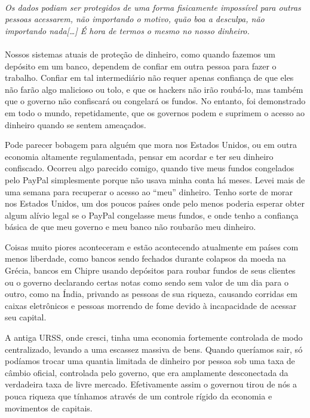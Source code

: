\paragraph{}
\textit{Os dados podiam ser protegidos de uma forma fisicamente impossível para outras pessoas acessarem, não importando o motivo, quão boa a desculpa, não importando nada[\ldots] É hora de termos o mesmo no nosso dinheiro.}
\paragraph{}

Nossos sistemas atuais de proteção de dinheiro, como quando fazemos um depósito em um banco, dependem de confiar em outra pessoa para fazer o trabalho. Confiar em tal intermediário não requer apenas confiança de que eles não farão algo malicioso ou tolo, e que os hackers não irão roubá-lo, mas também que o governo não confiscará ou congelará os fundos. No entanto, foi demonstrado em todo o mundo, repetidamente, que os governos podem e suprimem o acesso ao dinheiro quando se sentem ameaçados.

Pode parecer bobagem para alguém que mora nos Estados Unidos, ou em outra economia altamente regulamentada, pensar em acordar e ter seu dinheiro confiscado. Ocorreu algo parecido comigo, quando tive meus fundos congelados pelo PayPal simplesmente porque não usava minha conta há meses. Levei mais de uma semana para recuperar o acesso ao “meu” dinheiro. Tenho sorte de morar nos Estados Unidos, um dos poucos países onde pelo menos poderia esperar obter algum alívio legal se o PayPal congelasse meus fundos, e onde tenho a confiança básica de que meu governo e meu banco não roubarão meu dinheiro.

Coisas muito piores aconteceram e estão acontecendo atualmente em países com menos liberdade, como bancos sendo fechados durante colapsos da moeda na Grécia, bancos em Chipre usando depósitos para roubar fundos de seus clientes ou o governo declarando certas notas como sendo sem valor de um dia para o outro, como na Índia, privando as pessoas de sua riqueza, causando corridas em caixas eletrônicos e pessoas morrendo de fome devido à incapacidade de acessar seu capital.

A antiga URSS, onde cresci, tinha uma economia fortemente controlada de modo centralizado, levando a uma escassez massiva de bens. Quando queríamos sair, só podíamos trocar uma quantia limitada de dinheiro por pessoa sob uma taxa de câmbio oficial, controlada pelo governo, que era amplamente desconectada da verdadeira taxa de livre mercado. Efetivamente assim o governou tirou de nós a pouca riqueza que tínhamos através de um controle rígido da economia e movimentos de capitais.

